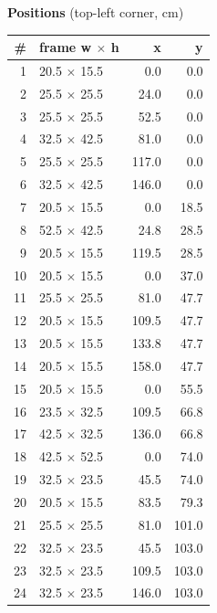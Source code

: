 \documentclass[a4paper,landscape,10pt]{article}
\begin{document}
\begin{minipage}[t]{0.25\textwidth}
\vspace{8pt}
{\bfseries Positions} (top-left corner, cm)\\[2pt]
\tiny
\begin{tabular}{@{}r l r r@{}}
\toprule
\# & frame w $\times$ h & x & y \\
\midrule
1 & 20.5 $\times$ 15.5 & 0.0 & 0.0 \\
2 & 25.5 $\times$ 25.5 & 24.0 & 0.0 \\
3 & 25.5 $\times$ 25.5 & 52.5 & 0.0 \\
4 & 32.5 $\times$ 42.5 & 81.0 & 0.0 \\
5 & 25.5 $\times$ 25.5 & 117.0 & 0.0 \\
6 & 32.5 $\times$ 42.5 & 146.0 & 0.0 \\
7 & 20.5 $\times$ 15.5 & 0.0 & 18.5 \\
8 & 52.5 $\times$ 42.5 & 24.8 & 28.5 \\
9 & 20.5 $\times$ 15.5 & 119.5 & 28.5 \\
10 & 20.5 $\times$ 15.5 & 0.0 & 37.0 \\
11 & 25.5 $\times$ 25.5 & 81.0 & 47.7 \\
12 & 20.5 $\times$ 15.5 & 109.5 & 47.7 \\
13 & 20.5 $\times$ 15.5 & 133.8 & 47.7 \\
14 & 20.5 $\times$ 15.5 & 158.0 & 47.7 \\
15 & 20.5 $\times$ 15.5 & 0.0 & 55.5 \\
16 & 23.5 $\times$ 32.5 & 109.5 & 66.8 \\
17 & 42.5 $\times$ 32.5 & 136.0 & 66.8 \\
18 & 42.5 $\times$ 52.5 & 0.0 & 74.0 \\
19 & 32.5 $\times$ 23.5 & 45.5 & 74.0 \\
20 & 20.5 $\times$ 15.5 & 83.5 & 79.3 \\
21 & 25.5 $\times$ 25.5 & 81.0 & 101.0 \\
22 & 32.5 $\times$ 23.5 & 45.5 & 103.0 \\
23 & 32.5 $\times$ 23.5 & 109.5 & 103.0 \\
24 & 32.5 $\times$ 23.5 & 146.0 & 103.0 \\
\bottomrule
\end{tabular}
\end{minipage}
\clearpage
\end{document}
